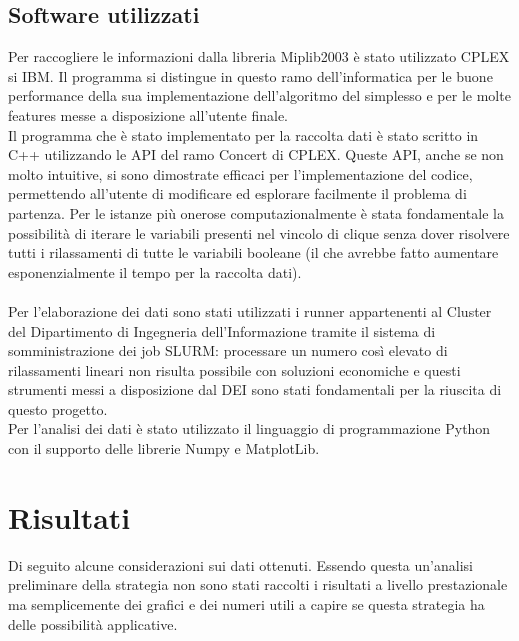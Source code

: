 \documentclass[12pt,a4paper,twoside,openright]{book}
\begin{document}
\section{Software utilizzati}
Per raccogliere le informazioni dalla libreria Miplib2003 è stato utilizzato CPLEX si IBM.
Il programma si distingue in questo ramo dell'informatica per le buone performance della 
sua implementazione dell'algoritmo del simplesso e per le molte features messe a 
disposizione all'utente finale.\\
Il programma che è stato implementato per la raccolta dati è stato scritto in C++ utilizzando 
le API del ramo Concert di CPLEX. Queste API, anche se non molto intuitive,
si sono dimostrate efficaci per l'implementazione del codice, permettendo all'utente di 
modificare ed esplorare facilmente il problema di partenza. Per le istanze più onerose 
computazionalmente è stata fondamentale la possibilità di iterare le variabili presenti nel
vincolo di clique senza dover risolvere tutti i rilassamenti di tutte le variabili booleane 
(il che avrebbe fatto aumentare esponenzialmente il tempo per la raccolta dati).\\\\

Per l'elaborazione dei dati sono stati utilizzati i runner appartenenti al Cluster del Dipartimento di Ingegneria 
dell'Informazione tramite il sistema di somministrazione dei job SLURM: 
processare un numero così elevato di rilassamenti lineari non risulta possibile con soluzioni 
economiche e questi strumenti messi a disposizione dal DEI sono stati fondamentali per 
la riuscita di questo progetto.
\\
Per l'analisi dei dati è stato utilizzato il linguaggio di programmazione Python con il supporto delle 
librerie Numpy e MatplotLib.

\chapter{Risultati}
Di seguito alcune considerazioni sui dati ottenuti. Essendo questa un'analisi preliminare della strategia
non sono stati raccolti i risultati a livello prestazionale ma semplicemente dei grafici e dei numeri 
utili a capire se questa strategia ha delle possibilità applicative. 
\end{document}
